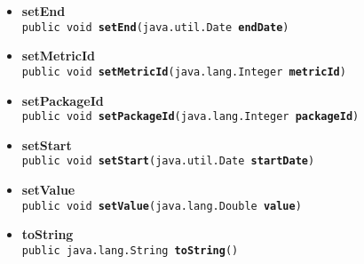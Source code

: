 {{{{\begin{itemize}
{\texttt{public native int\ {\bf  hashCode}()
\label{it.unisa.sesa.repominer.db.entities.PackageMetric.hashCode()}}%
}%
\item{ 
\hypertarget{it.unisa.sesa.repominer.db.entities.PackageMetric.setEnd(java.util.Date)}{{\bf  setEnd}\\}
\texttt{public void\ {\bf  setEnd}(\texttt{java.util.Date} {\bf  endDate})
\label{it.unisa.sesa.repominer.db.entities.PackageMetric.setEnd(java.util.Date)}}%
}%
\item{ 
\hypertarget{it.unisa.sesa.repominer.db.entities.PackageMetric.setMetricId(java.lang.Integer)}{{\bf  setMetricId}\\}
\texttt{public void\ {\bf  setMetricId}(\texttt{java.lang.Integer} {\bf  metricId})
\label{it.unisa.sesa.repominer.db.entities.PackageMetric.setMetricId(java.lang.Integer)}}%
}%
\item{ 
\hypertarget{it.unisa.sesa.repominer.db.entities.PackageMetric.setPackageId(java.lang.Integer)}{{\bf  setPackageId}\\}
\texttt{public void\ {\bf  setPackageId}(\texttt{java.lang.Integer} {\bf  packageId})
\label{it.unisa.sesa.repominer.db.entities.PackageMetric.setPackageId(java.lang.Integer)}}%
}%
\item{ 
\hypertarget{it.unisa.sesa.repominer.db.entities.PackageMetric.setStart(java.util.Date)}{{\bf  setStart}\\}
\texttt{public void\ {\bf  setStart}(\texttt{java.util.Date} {\bf  startDate})
\label{it.unisa.sesa.repominer.db.entities.PackageMetric.setStart(java.util.Date)}}%
}%
\item{ 
\hypertarget{it.unisa.sesa.repominer.db.entities.PackageMetric.setValue(java.lang.Double)}{{\bf  setValue}\\}
\texttt{public void\ {\bf  setValue}(\texttt{java.lang.Double} {\bf  value})
\label{it.unisa.sesa.repominer.db.entities.PackageMetric.setValue(java.lang.Double)}}%
}%
\item{ 
\hypertarget{it.unisa.sesa.repominer.db.entities.PackageMetric.toString()}{{\bf  toString}\\}
\texttt{public java.lang.String\ {\bf  toString}()
\label{it.unisa.sesa.repominer.db.entities.PackageMetric.toString()}}%
}%
\end{itemize}
}
}}}
